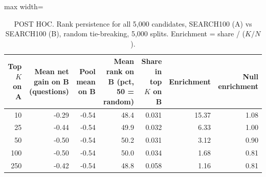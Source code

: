 \begin{table}[t]
\centering
\small
\begin{adjustbox}{max width=\linewidth}
\begin{tabular}{rrrrrrr}
\toprule
Top $K$ on A & Mean net gain on B (questions) & Pool mean on B & Mean rank on B (pct, 50 = random) & Share in top $K$ on B & Enrichment & Null enrichment \\
\midrule
10 & -0.29 & -0.54 & 48.4 & 0.031 & 15.37 & 1.08 \\
25 & -0.44 & -0.54 & 49.9 & 0.032 & 6.33 & 1.00 \\
50 & -0.50 & -0.54 & 50.2 & 0.031 & 3.12 & 0.90 \\
100 & -0.50 & -0.54 & 50.0 & 0.034 & 1.68 & 0.81 \\
250 & -0.42 & -0.54 & 48.8 & 0.058 & 1.16 & 0.81 \\
\bottomrule
\end{tabular}
\end{adjustbox}
\caption{POST HOC. Rank persistence for all 5,000 candidates, SEARCH100 (A) vs SEARCH100 (B), random tie-breaking, 5,000 splits. Enrichment = share / ($K/N$).}
\label{tab:rank-persistence}
\end{table}
